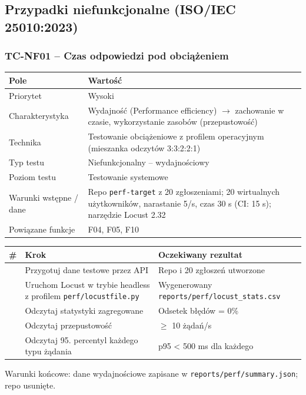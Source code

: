 \subsection{Przypadki niefunkcjonalne (ISO/IEC 25010:2023)}
\subsubsection{TC-NF01 – Czas odpowiedzi pod obciążeniem}
{\small
\par\smallskip\noindent\begin{tabular}{>{\raggedright\arraybackslash}p{}>{\raggedright\arraybackslash}p{}}
\toprule
\textbf{Pole} & \textbf{Wartość} \\
\midrule
Priorytet & Wysoki \\
Charakterystyka & Wydajność (Performance efficiency) $\rightarrow$ zachowanie w czasie, wykorzystanie zasobów (przepustowość) \\
Technika & Testowanie obciążeniowe z profilem operacyjnym (mieszanka odczytów 3:3:2:2:1) \\
Typ testu & Niefunkcjonalny – wydajnościowy \\
Poziom testu & Testowanie systemowe \\
Warunki wstępne / dane & Repo \texttt{perf-target} z 20 zgłoszeniami; 20 wirtualnych użytkowników, narastanie 5/s, czas 30 s (CI: 15 s); narzędzie Locust 2.32 \\
Powiązane funkcje & F04, F05, F10 \\
\bottomrule
\end{tabular}\par\smallskip
}
{\small
\par\smallskip\noindent\begin{tabular}{>{\raggedright\arraybackslash}p{}>{\raggedright\arraybackslash}p{}>{\raggedright\arraybackslash}p{}}
\toprule
\textbf{\#} & \textbf{Krok} & \textbf{Oczekiwany rezultat} \\
\midrule
1 & Przygotuj dane testowe przez API & Repo i 20 zgłoszeń utworzone \\
2 & Uruchom Locust w trybie headless z profilem \texttt{perf/\allowbreak{}locustfile.py} & Wygenerowany \texttt{reports/\allowbreak{}perf/\allowbreak{}locust\_\allowbreak{}stats.csv} \\
3 & Odczytaj statystyki zagregowane & Odsetek błędów = 0\% \\
4 & Odczytaj przepustowość & $\geq$ 10 żądań/s \\
5 & Odczytaj 95. percentyl każdego typu żądania & p95 < 500 ms dla każdego \\
\bottomrule
\end{tabular}\par\smallskip
}
Warunki końcowe: dane wydajnościowe zapisane w \texttt{reports/\allowbreak{}perf/\allowbreak{}summary.json}; repo usunięte.

